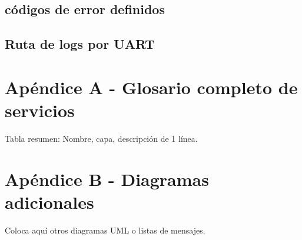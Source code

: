 \documentclass[11pt,a4paper]{article}
\begin{document}
\subsection{códigos de error definidos}
\subsection{Ruta de logs por UART}



\appendix
\section{Apéndice A - Glosario completo de servicios}
Tabla resumen: Nombre, capa, descripción de 1 línea.

\section{Apéndice B - Diagramas adicionales}
Coloca aquí otros diagramas UML o listas de mensajes.
\end{document}
